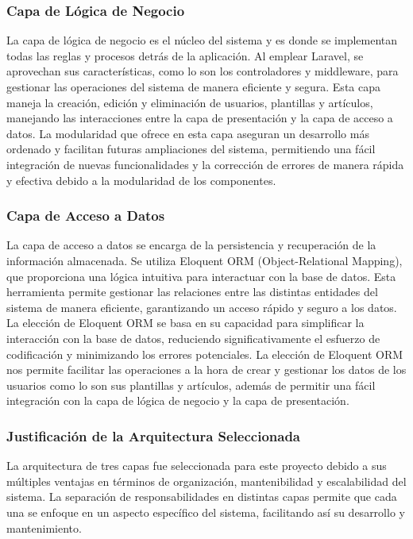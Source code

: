 \subsubsection{Capa de Lógica de Negocio}
La capa de lógica de negocio es el núcleo del sistema y es donde se implementan todas las reglas y procesos detrás de la aplicación. Al emplear Laravel, se aprovechan sus características, como lo son los controladores y middleware, para gestionar las operaciones del sistema de manera eficiente y segura. Esta capa maneja la creación, edición y eliminación de usuarios, plantillas y artículos, manejando las interacciones entre la capa de presentación y la capa de acceso a datos. La modularidad que ofrece en esta capa aseguran un desarrollo más ordenado y facilitan futuras ampliaciones del sistema, permitiendo una fácil integración de nuevas funcionalidades y la corrección de errores de manera rápida y efectiva debido a la modularidad de los componentes.

\subsubsection{Capa de Acceso a Datos}
La capa de acceso a datos se encarga de la persistencia y recuperación de la información almacenada. Se utiliza Eloquent ORM (Object-Relational Mapping), que proporciona una lógica intuitiva para interactuar con la base de datos. Esta herramienta permite gestionar las relaciones entre las distintas entidades del sistema de manera eficiente, garantizando un acceso rápido y seguro a los datos. La elección de Eloquent ORM se basa en su capacidad para simplificar la interacción con la base de datos, reduciendo significativamente el esfuerzo de codificación y minimizando los errores potenciales. La elección de Eloquent ORM nos permite facilitar las operaciones a la hora de crear y gestionar los datos de los usuarios como lo son sus plantillas y artículos, además de permitir una fácil integración con la capa de lógica de negocio y la capa de presentación.

\subsubsection{Justificación de la Arquitectura Seleccionada}
La arquitectura de tres capas fue seleccionada para este proyecto debido a sus múltiples ventajas en términos de organización, mantenibilidad y escalabilidad del sistema. La separación de responsabilidades en distintas capas permite que cada una se enfoque en un aspecto específico del sistema, facilitando así su desarrollo y mantenimiento. 

